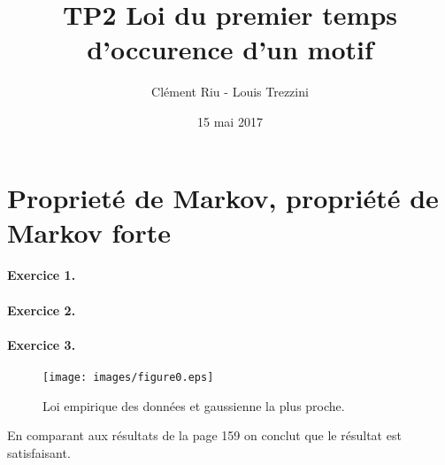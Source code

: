 \documentclass[12pt,a4paper]{article}
\title{\textbf{TP2 Loi du premier temps d’occurence d’un motif}}
\author{Clément Riu - Louis Trezzini}
\date{15 mai 2017}
\begin{document}
\maketitle

\section{Proprieté de Markov, propriété de Markov forte}

\paragraph*{Exercice 1.}

\paragraph*{Exercice 2.}

\paragraph*{Exercice 3.}

\begin{figure}[H]
	\centering
	\texttt{[image: images/figure0.eps]}
	\caption{Loi empirique des données et gaussienne la plus proche.}
\end{figure}

En comparant aux résultats de la page 159 on conclut que le résultat est satisfaisant.
\end{document}

